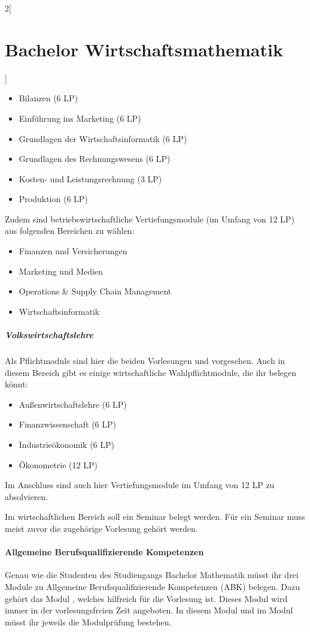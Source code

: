 \begin{multicols}{2}[\section{Bachelor Wirtschaftsmathematik}]
\begin{itemize}\itemsep 0pt
    \item Bilanzen (6 LP)
    \item Einführung ins Marketing (6 LP)
    \item Grundlagen der Wirtschaftsinformatik (6 LP)
    \item Grundlagen des Rechnungswesens (6 LP)
    \item Kosten- und Leistungsrechnung (3 LP)
    \item Produktion (6 LP)
\end{itemize}

Zudem sind betriebswirtschaftliche Vertiefungsmodule (im Umfang von 12 LP) aus
folgenden Bereichen zu wählen:

\begin{itemize}\itemsep 0pt
    \item Finanzen und Versicherungen
    \item Marketing und Medien
    \item Operations \& Supply Chain Management
    \item Wirtschaftsinformatik
\end{itemize}

\subparagraph{Volkswirtschaftslehre}
Als Pflichtmodule sind hier die beiden Vorlesungen  und
 vorgesehen. Auch in diesem Bereich gibt es einige
wirtschaftliche Wahlpflichtmodule, die ihr belegen könnt:

\begin{itemize}\itemsep 0pt
    \item Außenwirtschaftslehre (6 LP)
    \item Finanzwissenschaft (6 LP)
    \item Industrieökonomik (6 LP)
    \item Ökonometrie (12 LP)
\end{itemize}

Im Anschluss sind auch hier Vertiefungsmodule im Umfang von 12 LP zu
absolvieren.

Im wirtschaftlichen Bereich soll ein Seminar belegt werden. Für ein Seminar
muss meist zuvor die zugehörige Vorlesung gehört werden.

\paragraph{Allgemeine Berufsqualifizierende Kompetenzen}

Genau wie die Studenten des Studiengangs Bachelor Mathematik müsst ihr drei
Module zu Allgemeine Berufsqualifizierende Kompetenzen (ABK) belegen. Dazu
gehört das Modul , welches hilfreich für die
Vorlesung  ist. Dieses Modul wird immer in der
vorlesungsfreien Zeit angeboten. In diesem Modul und im Modul
 müsst ihr jeweils die Modulprüfung bestehen.


\end{multicols}
